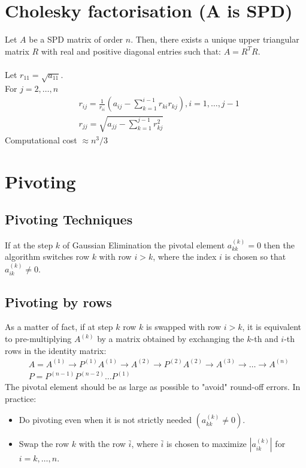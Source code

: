 \documentclass[11pt]{book}
\begin{document}
\section*{Cholesky factorisation (A is SPD)}
Let $A$ be a SPD matrix of order $n$. Then, there exists a unique upper triangular matrix $R$ with real and positive diagonal entries such that: $A=R^{T} R$.\\  \\
Let $r_{11}=\sqrt{a_{11}}$. \\
For $j=2, \ldots, n$
$$
\begin{aligned}
& r_{i j}=\frac{1}{r_{i i}}\left(a_{i j}-\sum_{k=1}^{i-1} r_{k i} r_{k j}\right), i=1, \ldots, j-1 \\
& r_{j j}=\sqrt{a_{j j}-\sum_{k=1}^{j-1} r_{k j}^{2}}
\end{aligned}
$$
Computational cost $\approx n^{3} / 3$


\section*{Pivoting}
\subsection*{Pivoting Techniques}
If at the step $k$ of Gaussian Elimination the pivotal element $a_{k k}^{(k)}=0$ then the algorithm switches row $k$ with row $i>k$, where the index $i$ is chosen so that $a_{i k}^{(k)} \neq 0$.

\subsection*{Pivoting by rows}
As a matter of fact, if at step $k$ row $k$ is swapped with row $i>k$, it is equivalent to pre-multiplying $A^{(k)}$ by a matrix obtained by exchanging the $k$-th and $i$-th rows in the identity matrix:
$$
\begin{aligned}
& A=A^{(1)} \rightarrow P^{(1)} A^{(1)} \rightarrow A^{(2)} \rightarrow P^{(2)} A^{(2)} \rightarrow A^{(3)} \rightarrow \ldots \rightarrow A^{(n)} \\
& P=P^{(n-1)} P^{(n-2)} \ldots P^{(1)}
\end{aligned}
$$
The pivotal element should be as large as possible to "avoid" round-off errors. In practice:
\begin{itemize}
  \item Do pivoting even when it is not strictly needed $\left(a_{k k}^{(k)} \neq 0\right)$.
  \item Swap the row $k$ with the row $\bar{i}$, where $\bar{i}$ is chosen to maximize $\left|a_{i k}^{(k)}\right|$ for $i=k, \ldots, n$.
\end{itemize}
\end{document}
